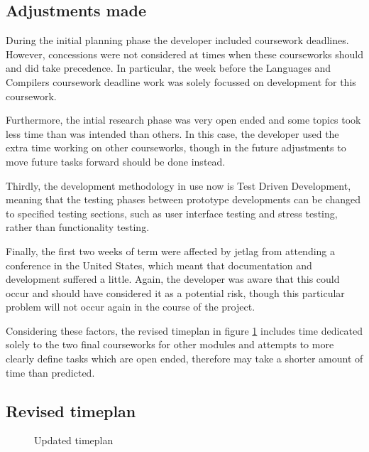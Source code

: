 \subsection{Adjustments made}
During the initial planning phase the developer included coursework deadlines. However, concessions were not considered at times when these courseworks should and did take precedence. In particular, the week before the Languages and Compilers coursework deadline work was solely focussed on development for this coursework.

Furthermore, the intial research phase was very open ended and some topics took less time than was intended than others. In this case, the developer used the extra time working on other courseworks, though in the future adjustments to move future tasks forward should be done instead.

Thirdly, the development methodology in use now is Test Driven Development, meaning that the testing phases between prototype developments can be changed to specified testing sections, such as user interface testing and stress testing, rather than functionality testing.

Finally, the first two weeks of term were affected by jetlag from attending a conference in the United States, which meant that documentation and development suffered a little. Again, the developer was aware that this could occur and should have considered it as a potential risk, though this particular problem will not occur again in the course of the project.

Considering these factors, the revised timeplan in figure \ref{fig:timeplan} includes time dedicated solely to the two final courseworks for other modules and attempts to more clearly define tasks which are open ended, therefore may take a shorter amount of time than predicted.

\begin{landscape}
\subsection{Revised timeplan}
\begin{figure}[H]
	\centering
\end{figure}
\begin{figure}[h]
\centering
\end{figure}
\begin{figure}[h]
\centering
 \caption{Updated timeplan}
 \label{fig:timeplan}
\end{figure}
\end{landscape}
